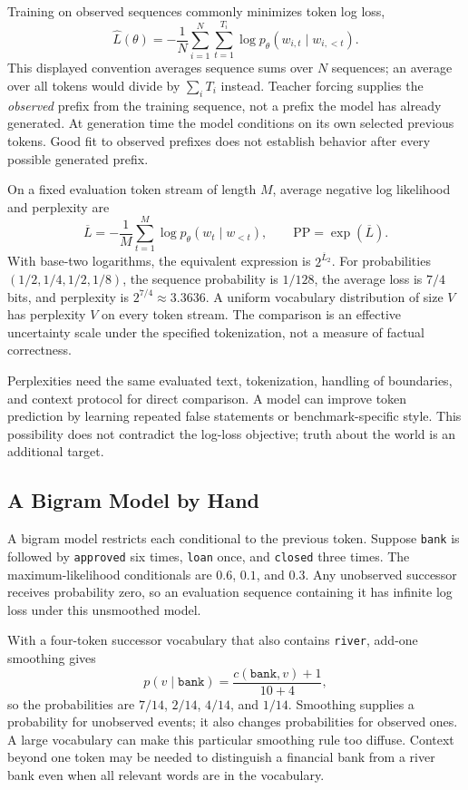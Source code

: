 Training on observed sequences commonly minimizes token log loss,
\[
 \widehat L(\theta)=-\frac1N\sum_{i=1}^{N}\sum_{t=1}^{T_i}
 \log p_\theta(w_{i,t}\mid w_{i,<t}).
\]
This displayed convention averages sequence sums over $N$ sequences; an average over all tokens would divide by $\sum_iT_i$ instead. Teacher forcing supplies the \emph{observed} prefix from the training sequence, not a prefix the model has already generated. At generation time the model conditions on its own selected previous tokens. Good fit to observed prefixes does not establish behavior after every possible generated prefix.

On a fixed evaluation token stream of length $M$, average negative log likelihood and perplexity are
\[
 \overline L=-\frac1M\sum_{t=1}^{M}\log p_\theta(w_t\mid w_{<t}),
 \qquad \mathrm{PP}=\exp(\overline L).
\]
With base-two logarithms, the equivalent expression is $2^{\overline L_2}$. For probabilities $(1/2,1/4,1/2,1/8)$, the sequence probability is $1/128$, the average loss is $7/4$ bits, and perplexity is $2^{7/4}\approx3.3636$. A uniform vocabulary distribution of size $V$ has perplexity $V$ on every token stream. The comparison is an effective uncertainty scale under the specified tokenization, not a measure of factual correctness.

Perplexities need the same evaluated text, tokenization, handling of boundaries, and context protocol for direct comparison. A model can improve token prediction by learning repeated false statements or benchmark-specific style. This possibility does not contradict the log-loss objective; truth about the world is an additional target.

\subsection{A Bigram Model by Hand}

A bigram model restricts each conditional to the previous token. Suppose \texttt{bank} is followed by \texttt{approved} six times, \texttt{loan} once, and \texttt{closed} three times. The maximum-likelihood conditionals are $0.6$, $0.1$, and $0.3$. Any unobserved successor receives probability zero, so an evaluation sequence containing it has infinite log loss under this unsmoothed model.

With a four-token successor vocabulary that also contains \texttt{river}, add-one smoothing gives
\[
 p(v\mid\texttt{bank})=\frac{c(\texttt{bank},v)+1}{10+4},
\]
so the probabilities are $7/14$, $2/14$, $4/14$, and $1/14$. Smoothing supplies a probability for unobserved events; it also changes probabilities for observed ones. A large vocabulary can make this particular smoothing rule too diffuse. Context beyond one token may be needed to distinguish a financial bank from a river bank even when all relevant words are in the vocabulary.

